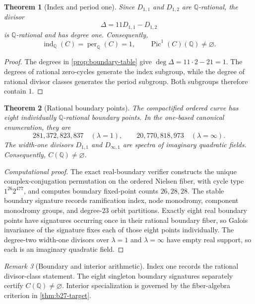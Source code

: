 \documentclass[11pt]{article}
\newtheorem{theorem}{Theorem}[section]
\theoremstyle{remark}
\newtheorem{remark}[theorem]{Remark}
\newcommand{\Q}{\mathbb Q}
\newcommand{\Pic}{\operatorname{Pic}}
\begin{document}
\begin{theorem}[Index and period one]\label{thm:index-one}
Since $D_{1,1}$ and $D_{1,2}$ are $\Q$-rational, the divisor
\[
 \Delta=11D_{1,1}-D_{1,2}
\]
is $\Q$-rational and has degree one.  Consequently,
\[
 \operatorname{ind}_{\Q}(C)=\operatorname{per}_{\Q}(C)=1,
 \qquad \Pic^1(C)(\Q)\neq\varnothing.
\]
\end{theorem}

\begin{proof}
The degrees in \cref{prop:boundary-table} give $\deg\Delta=11\cdot2-21=1$.  The degrees of rational zero-cycles generate the index subgroup, while the degree of rational divisor classes generates the period subgroup.  Both subgroups therefore contain $1$.
\end{proof}

\begin{theorem}[Rational boundary points]\label{thm:rational-boundary}
The compactified ordered curve has eight individually $\Q$-rational boundary points.  In the one-based canonical enumeration, they are
\[
 281,372,823,837\quad(\lambda=1),\qquad
 20,770,818,973\quad(\lambda=\infty).
\]
The width-one divisors $D_{1,1}$ and $D_{\infty,1}$ are spectra of imaginary quadratic fields.  Consequently, $C(\Q)\neq\varnothing$.
\end{theorem}

\begin{proof}[Computational proof]
The exact real-boundary verifier constructs the unique complex-conjugation permutation on the ordered Nielsen fiber, with cycle type $1^{26}2^{477}$, and computes boundary fixed-point counts $26,28,28$.  The stable boundary signature records ramification index, node monodromy, component monodromy groups, and degree-$23$ orbit partitions.  Exactly eight real boundary points have signatures occurring once in their rational boundary fiber, so Galois invariance of the signature fixes each of those eight points individually.  The degree-two width-one divisors over $\lambda=1$ and $\lambda=\infty$ have empty real support, so each is an imaginary quadratic field.
\end{proof}

\begin{remark}[Boundary and interior arithmetic]
Index one records the rational divisor-class statement.  The eight singleton boundary signatures separately certify $C(\Q)\neq\varnothing$.  Interior specialization is governed by the fiber-algebra criterion in \cref{thm:b27-target}.
\end{remark}
\end{document}
